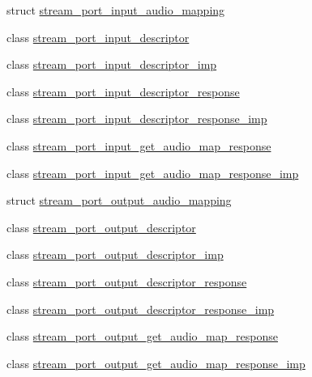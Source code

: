 \begin{DoxyCompactItemize}
\item 
struct \hyperlink{structavdecc__lib_1_1stream__port__input__audio__mapping}{stream\+\_\+port\+\_\+input\+\_\+audio\+\_\+mapping}
\item 
class \hyperlink{classavdecc__lib_1_1stream__port__input__descriptor}{stream\+\_\+port\+\_\+input\+\_\+descriptor}
\item 
class \hyperlink{classavdecc__lib_1_1stream__port__input__descriptor__imp}{stream\+\_\+port\+\_\+input\+\_\+descriptor\+\_\+imp}
\item 
class \hyperlink{classavdecc__lib_1_1stream__port__input__descriptor__response}{stream\+\_\+port\+\_\+input\+\_\+descriptor\+\_\+response}
\item 
class \hyperlink{classavdecc__lib_1_1stream__port__input__descriptor__response__imp}{stream\+\_\+port\+\_\+input\+\_\+descriptor\+\_\+response\+\_\+imp}
\item 
class \hyperlink{classavdecc__lib_1_1stream__port__input__get__audio__map__response}{stream\+\_\+port\+\_\+input\+\_\+get\+\_\+audio\+\_\+map\+\_\+response}
\item 
class \hyperlink{classavdecc__lib_1_1stream__port__input__get__audio__map__response__imp}{stream\+\_\+port\+\_\+input\+\_\+get\+\_\+audio\+\_\+map\+\_\+response\+\_\+imp}
\item 
struct \hyperlink{structavdecc__lib_1_1stream__port__output__audio__mapping}{stream\+\_\+port\+\_\+output\+\_\+audio\+\_\+mapping}
\item 
class \hyperlink{classavdecc__lib_1_1stream__port__output__descriptor}{stream\+\_\+port\+\_\+output\+\_\+descriptor}
\item 
class \hyperlink{classavdecc__lib_1_1stream__port__output__descriptor__imp}{stream\+\_\+port\+\_\+output\+\_\+descriptor\+\_\+imp}
\item 
class \hyperlink{classavdecc__lib_1_1stream__port__output__descriptor__response}{stream\+\_\+port\+\_\+output\+\_\+descriptor\+\_\+response}
\item 
class \hyperlink{classavdecc__lib_1_1stream__port__output__descriptor__response__imp}{stream\+\_\+port\+\_\+output\+\_\+descriptor\+\_\+response\+\_\+imp}
\item 
class \hyperlink{classavdecc__lib_1_1stream__port__output__get__audio__map__response}{stream\+\_\+port\+\_\+output\+\_\+get\+\_\+audio\+\_\+map\+\_\+response}
\item 
class \hyperlink{classavdecc__lib_1_1stream__port__output__get__audio__map__response__imp}{stream\+\_\+port\+\_\+output\+\_\+get\+\_\+audio\+\_\+map\+\_\+response\+\_\+imp}

\end{DoxyCompactItemize}

